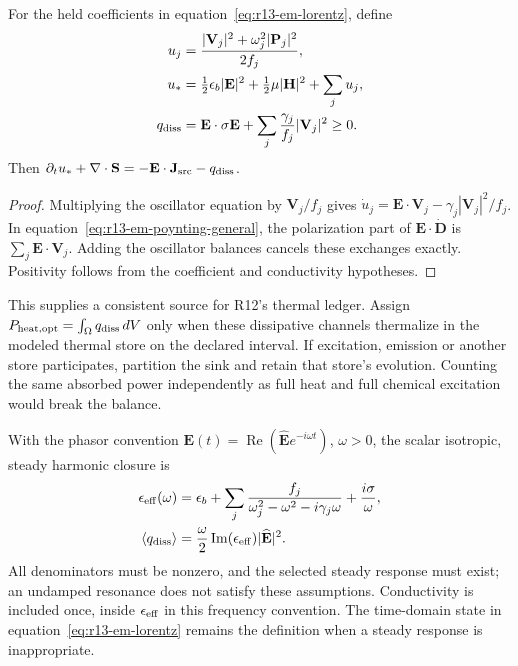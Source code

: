 \begin{proposition}
For the held coefficients in equation~\eqref{eq:r13-em-lorentz}, define
\begin{align}
 u_j&=\frac{|\mathbf V_j|^2+\omega_j^2|\mathbf P_j|^2}{2f_j},\nonumber\\
 u_*&=\tfrac12\epsilon_b|\mathbf E|^2+
       \tfrac12\mu|\mathbf H|^2+\sum_j u_j,\nonumber\\
 q_{\rm diss}&=\mathbf E\cdot\sigma\mathbf E+
                    \sum_j\frac{\gamma_j}{f_j}|\mathbf V_j|^2\ge0.
 \label{eq:r13-em-storage}
\end{align}
Then $\partial_tu_*+\nabla\cdot\mathbf S
=-\mathbf E\cdot\mathbf J_{\rm src}-q_{\rm diss}$.
\end{proposition}
\begin{proof}
Multiplying the oscillator equation by $\mathbf V_j/f_j$ gives
$\dot u_j=\mathbf E\cdot\mathbf V_j-
\gamma_j|\mathbf V_j|^2/f_j$.
In equation~\eqref{eq:r13-em-poynting-general}, the polarization part of
$\mathbf E\cdot\dot{\mathbf D}$ is $\sum_j\mathbf E\cdot\mathbf V_j$.
Adding the oscillator balances cancels these exchanges exactly. Positivity
follows from the coefficient and conductivity hypotheses.
\end{proof}

This supplies a consistent source for R12's thermal ledger. Assign
$P_{\rm heat,opt}=\int_\Omega q_{\rm diss}\,dV$ only when these dissipative
channels thermalize in the modeled thermal store on the declared interval.
If excitation, emission or another store participates, partition the sink and
retain that store's evolution. Counting the same absorbed power independently
as full heat and full chemical excitation would break the balance.

With the phasor convention $\mathbf E(t)=\operatorname{Re}
(\widehat{\mathbf E}e^{-i\omega t})$, $\omega>0$, the scalar isotropic,
steady harmonic closure is
\begin{align}
 \epsilon_{\rm eff}(\omega)&=\epsilon_b+
 \sum_j\frac{f_j}{\omega_j^2-\omega^2-i\gamma_j\omega}
 +\frac{i\sigma}{\omega},\nonumber\\
 \langle q_{\rm diss}\rangle&=
 \frac{\omega}{2}\operatorname{Im}(\epsilon_{\rm eff})
                  |\widehat{\mathbf E}|^2.
 \label{eq:r13-em-epsilon}
\end{align}
All denominators must be nonzero, and the selected steady response must exist;
an undamped resonance does not satisfy these assumptions. Conductivity is
included once, inside $\epsilon_{\rm eff}$ in this frequency convention.
The time-domain state in equation~\eqref{eq:r13-em-lorentz} remains the
definition when a steady response is inappropriate.

